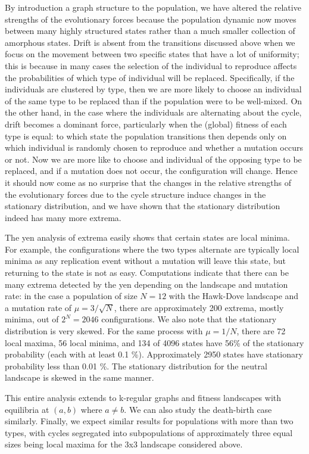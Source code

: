 \documentclass[aps,prd,11pt,notitlepage,nofootinbib,superscriptaddress,showkeys,letterpaper]{revtex4-1}
\begin{document}
By introduction a graph structure to the population, we have altered the
relative strengths of the evolutionary forces because the population dynamic
now moves between many highly structured states rather than a much smaller collection
of amorphous states. Drift is absent from the transitions discussed above when we focus
on the movement between two specific states that have a lot of uniformity; this is
because
in many cases the selection of the individual to reproduce affects the probabilities
of which type of individual will be replaced. Specifically, if the individuals
are clustered by type, then we are more likely to choose an individual of the same
type to be replaced than if the population were to be well-mixed. On the other hand,
in the case where the individuals are alternating
about the cycle, drift becomes a dominant force, particularly when the (global)
fitness of each type is equal: to which state the
population transitions then depends only on which individual is randomly chosen
to reproduce and whether a mutation occurs or not. Now we are more like to choose
and individual of the opposing type to be replaced, and if a mutation does not occur,
the configuration will change. Hence it should now come as no surprise
that the changes in the relative strengths of the evolutionary forces due to the
cycle structure induce changes in the stationary distribution, and we have shown
that the stationary distribution indeed has many more extrema.

The yen analysis of extrema easily shows that certain states are
local minima. For example, the configurations where the two types alternate are
typically local minima as any replication event without a mutation will leave
this state, but returning to the state is not as easy. Computations indicate
that there can be many extrema detected by the yen depending on the landscape
and mutation rate: in the case a population of size $N=12$
with the Hawk-Dove landscape and a mutation
rate of $\mu = 3/\sqrt{N}$, there are approximately 200 extrema, mostly minima, out
of $2^N = 2046$ configurations. We also note that the stationary distribution
is very skewed. For the same process with $\mu = 1/N$, there are 72 local maxima,
56 local minima, and 134 of 4096 states have 56\% of the stationary probability
(each with at least 0.1 \%). Approximately 2950 states have stationary
probability less than 0.01 \%. The stationary distribution for the neutral
landscape is skewed in the same manner.

This entire analysis extends to k-regular graphs and fitness landscapes with
equilibria at $(a, b)$ where $a \neq b$. We can also study the death-birth case
similarly. Finally, we expect similar results for populations
with more than two types, with cycles segregated into subpopulations of approximately
three equal sizes being local maxima for the 3x3 landscape considered above.
\end{document}

